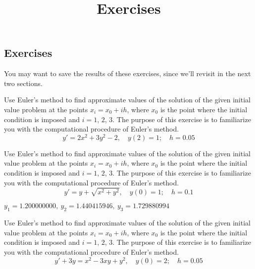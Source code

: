\documentclass{ximera}
\title{Exercises} \license{CC BY-NC-SA 4.0}
\begin{document}
\begin{abstract}
\end{abstract}
\maketitle

\begin{onlineOnly}
\section*{Exercises}
\end{onlineOnly}



You may want to save the results of these
exercises, since we'll revisit in the next two sections.


\begin{problem}\label{exer:3.1.1} Use Euler's method to find approximate values of the solution of the given initial value problem
at the points $x_i=x_0+ih$, where $x_0$ is the point where the
initial condition is imposed and $i=1$, $2$, $3$. The purpose of this exercise is to familiarize you with the computational procedure of Euler's method.
$$y'=2x^2+3y^2-2,\quad y(2)=1;\quad h=0.05$$
\end{problem}

\begin{problem}\label{exer:3.1.2} Use Euler's method to find approximate values of the solution of the given initial value problem
at the points $x_i=x_0+ih$, where $x_0$ is the point where the
initial condition is imposed and $i=1$, $2$, $3$. The purpose of this exercise is to familiarize you with the computational procedure of Euler's method.
$$y'=y+\sqrt{x^2+y^2},\quad y(0)=1;\quad h=0.1$$



\begin{solution}
    $y_1=1.200000000,\ y_2=1.440415946,\ y_3=1.729880994$
\end{solution}
\end{problem}

\begin{problem}\label{exer:3.1.3} Use Euler's method to find approximate values of the solution of the given initial value problem
at the points $x_i=x_0+ih$, where $x_0$ is the point where the
initial condition is imposed and $i=1$, $2$, $3$. The purpose of this exercise is to familiarize you with the computational procedure of Euler's method.
$$y'+3y=x^2-3xy+y^2,\quad y(0)=2;\quad h=0.05$$
\end{problem}
\end{document}
